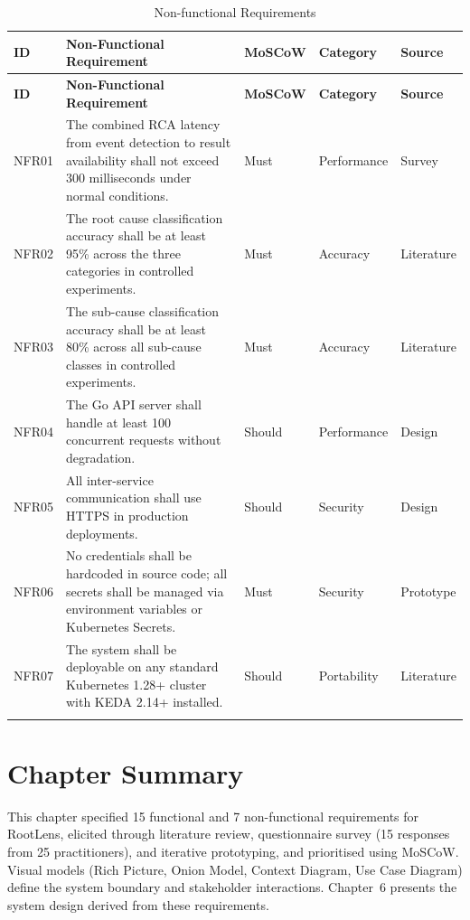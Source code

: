 \begin{xltabular}{\textwidth}{|p{1.2cm}|X|p{2cm}|p{2.3cm}|p{1.8cm}|}

\hline
\textbf{ID} & \textbf{Non-Functional Requirement} & \textbf{MoSCoW} & \textbf{Category} & \textbf{Source} \\ \hline
\endfirsthead

\hline
\textbf{ID} & \textbf{Non-Functional Requirement} & \textbf{MoSCoW} & \textbf{Category} & \textbf{Source} \\ \hline
\endhead

NFR01 & The combined RCA latency from event detection to result availability shall not exceed 300 milliseconds under normal conditions. & Must & Performance & Survey \\ \hline
NFR02 & The root cause classification accuracy shall be at least 95\% across the three categories in controlled experiments. & Must & Accuracy & Literature \\ \hline
NFR03 & The sub-cause classification accuracy shall be at least 80\% across all sub-cause classes in controlled experiments. & Must & Accuracy & Literature \\ \hline
NFR04 & The Go API server shall handle at least 100 concurrent requests without degradation. & Should & Performance & Design \\ \hline
NFR05 & All inter-service communication shall use HTTPS in production deployments. & Should & Security & Design \\ \hline
NFR06 & No credentials shall be hardcoded in source code; all secrets shall be managed via environment variables or Kubernetes Secrets. & Must & Security & Prototype \\ \hline
NFR07 & The system shall be deployable on any standard Kubernetes 1.28+ cluster with KEDA 2.14+ installed. & Should & Portability & Literature \\ \hline

\caption{Non-functional Requirements}
\label{tab:nonfunctional_requirements}
\end{xltabular}

\section{Chapter Summary}
This chapter specified 15 functional and 7 non-functional requirements for RootLens, elicited through literature review, questionnaire survey (15 responses from 25 practitioners), and iterative prototyping, and prioritised using MoSCoW. Visual models (Rich Picture, Onion Model, Context Diagram, Use Case Diagram) define the system boundary and stakeholder interactions. Chapter~6 presents the system design derived from these requirements.